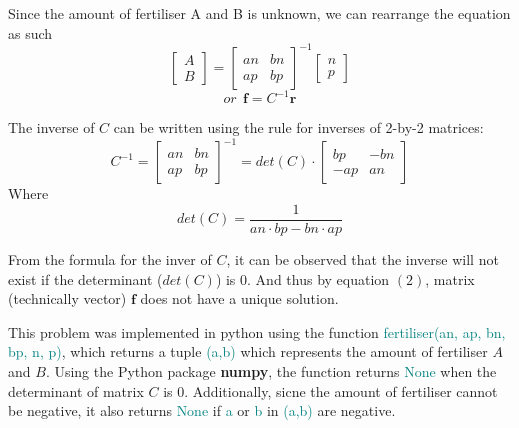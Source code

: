 \documentclass[a4paper]{article}
\newcommand \fertiliser {\textcolor{teal}{fertiliser(an, ap, bn, bp, n, p)}}
\begin{document}
\noindent
Since the amount of fertiliser A and B is unknown, we can rearrange the equation as such
\begin{equation}
    \begin{bmatrix} A \\B \end{bmatrix} =
    \begin{bmatrix} an & bn \\ ap & bp \end{bmatrix}^{-1}
    \begin{bmatrix} n \\p \end{bmatrix}
\end{equation}
\begin{equation} or \ \ \mathbf{f} = C^{-1}\mathbf{r} \end{equation}

\noindent
The inverse of $C$ can be written using the rule for inverses of 2-by-2 matrices:
\begin{equation*}
    C^{-1} = 
    \begin{bmatrix} an & bn \\ ap & bp \end{bmatrix}^{-1} =
    det(C)\cdot \begin{bmatrix} bp & -bn \\ -ap & an \end{bmatrix}
\end{equation*}
Where
\begin{equation*}
    det(C) = \frac{1}{an\cdot bp - bn\cdot ap} 
\end{equation*}

\noindent
From the formula for the inver of $C$, it can be observed that the inverse will not exist if the determinant ($det(C)$) is $0$. And thus by equation $(2)$, matrix (technically vector) $\mathbf{f}$ does not have a unique solution. 
\vspace{2mm}

\noindent
This problem was implemented in python using the function \fertiliser, which returns a tuple \textcolor{teal}{(a,b)} which represents the amount of fertiliser $A$ and $B$. Using the Python package \textbf{numpy}, the function returns \textcolor{teal}{None} when the determinant of matrix $C$ is $0$. Additionally, sicne the amount of fertiliser cannot be negative, it also returns \textcolor{teal}{None} if \textcolor{teal}{a} or \textcolor{teal}{b} in \textcolor{teal}{(a,b)} are negative.

\printbibliography
\end{document}
